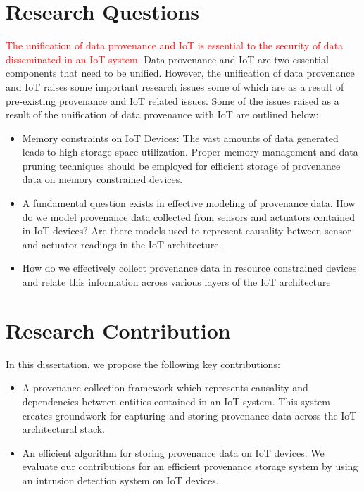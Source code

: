\section{Research Questions}
\textcolor{red}{The unification of data provenance and IoT is essential to the security of data disseminated in an IoT system.} Data provenance and IoT are two essential components that need to be unified. However, the unification of data provenance and IoT raises some important research issues some of which are as a result of pre-existing provenance and IoT related issues. Some of the issues raised as a result of the unification of data provenance with IoT are outlined below:

\begin{itemize}

\item Memory constraints on IoT Devices: The vast amounts of data generated leads to high storage space utilization. Proper memory management and data pruning techniques should be employed for efficient storage of provenance data on memory constrained devices. 

\item A fundamental question exists in effective modeling of provenance data. How do we model provenance data collected from sensors and actuators contained in IoT devices? Are there models used to represent causality between sensor and actuator readings in the IoT architecture.

\item How do we effectively collect provenance data in resource constrained devices and relate this information across various layers of the IoT architecture

\end{itemize}

\section{Research Contribution}

In this dissertation, we propose the following key contributions:

\begin{itemize}
  \item A provenance collection framework which represents causality and dependencies between entities contained in an IoT system. This system creates groundwork for capturing and storing provenance data  across the IoT architectural stack.
  \item An efficient algorithm for storing provenance data on IoT devices. We evaluate our contributions for an efficient provenance storage system by using an intrusion detection system on IoT devices.
\end{itemize}

